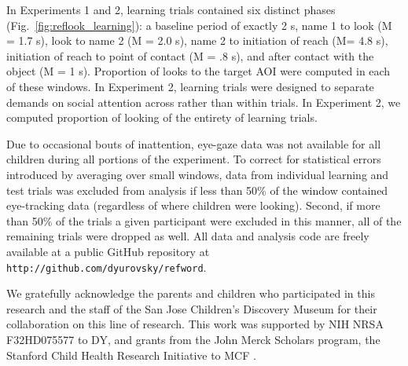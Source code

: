 \documentclass{pnastwo}
\begin{document}
\begin{article}
\begin{materials}
In Experiments 1 and 2, learning trials contained six distinct phases (Fig.~\ref{fig:reflook_learning}): a baseline period of exactly 2 s, name 1 to look (M = 1.7 s), look to name 2 (M = 2.0 s), name 2 to initiation of reach (M= 4.8 s), initiation of reach to point of contact (M = .8 s), and after contact with the object (M = 1 s). Proportion of looks to the target AOI were computed in each of these windows. In Experiment 2, learning trials were designed to separate demands on social attention across rather than within trials. In Experiment 2, we computed proportion of looking of the entirety of learning trials.

Due to occasional bouts of inattention, eye-gaze data was not available for all children during all portions of the experiment. To correct for statistical errors introduced by averaging over small windows,
data from individual learning and test trials was excluded from analysis if less than 50\% of the window contained eye-tracking data (regardless of where children were looking). Second, if more than 50\% of the trials a given participant were excluded in this manner, all of the remaining trials were dropped as well. All data and analysis code are freely available at a public GitHub repository at \small{\tt{http://github.com/dyurovsky/refword}}.

\end{materials}

\begin{acknowledgments}
We gratefully acknowledge the parents and children who participated in this research and the staff of the San Jose Children's Discovery Museum for their collaboration on this line of research. This work was supported by NIH NRSA F32HD075577 to DY,  and grants from the John Merck Scholars program, the Stanford Child Health Research Initiative to MCF .
\end{acknowledgments}




\end{article}
\end{document}
